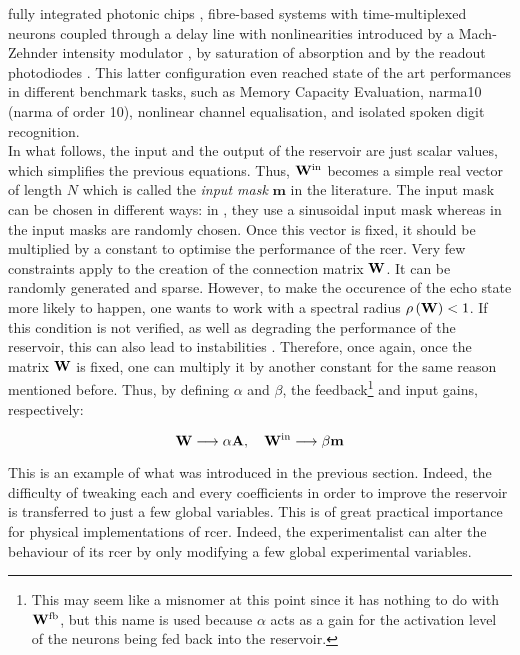  
 fully integrated photonic chips \cite{Vandoorne2014}, fibre-based systems with time-multiplexed neurons coupled through a delay line with nonlinearities introduced by a Mach-Zehnder intensity modulator \cite{Paquot2012, Antonik2017, Duport2016}, by saturation of absorption \cite{Dejonckheere2014, Vandoorne2008} and by the readout photodiodes \cite{Vinckier2015}. This latter configuration even reached state of the art performances in different benchmark tasks, such as Memory Capacity Evaluation, \acrshort{narma}10 (\acrlong{narma} of order 10), nonlinear channel equalisation, and isolated spoken digit recognition. \\


In what follows, the input and the output of the reservoir are just scalar values, which simplifies the previous equations. Thus, $\mathbf{W}^{\text{in}}$ becomes a simple real vector of length $N$ which is called the \textit{input mask} $\mathbf{m}$ in the literature. The input mask can be chosen in different ways: in \cite{Duport2016}, they use a sinusoidal input mask whereas in \cite{Antonik2017, Vinckier2015, Paquot2012} the input masks are randomly chosen. Once this vector is fixed, it should be multiplied by a constant to optimise the performance of the \gls{rcer}. Very few constraints apply to the creation of the connection matrix $\mathbf{W}$. It can be randomly generated and sparse. However, to make the occurence of the echo state more likely to happen, one wants to work with a spectral radius $\rho \left( \mathbf{W} \right)<1$. If this condition is not verified, as well as degrading the performance of the reservoir, this can also lead to instabilities \cite{Lukoeviius2009}. Therefore, once again, once the matrix $\mathbf{W}$ is fixed, one can multiply it by another constant for the same reason mentioned before. Thus, by defining $\alpha$ and $\beta$,  the feedback\footnote{This may seem like a misnomer at this point since it has nothing to do with $\mathbf{W}^{\text{fb}}$, but this name is used because $\alpha$ acts as a gain for the activation level of the neurons being fed back into the reservoir.} and input gains, respectively:

\begin{equation}
	\mathbf{W} \longrightarrow \alpha \mathbf{A}, \quad \mathbf{W}^{\text{in}} \longrightarrow \beta \mathbf{m}
\end{equation}

This is an example of what was introduced in the previous section. Indeed, the difficulty of tweaking each and every coefficients in order to improve the reservoir is transferred to just a few global variables. This is of great practical importance for physical implementations of \gls{rcer}. Indeed, the experimentalist can alter the behaviour of its \gls{rcer} by only modifying a few global experimental variables.\\

